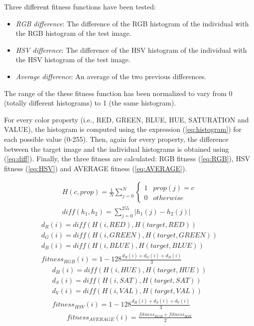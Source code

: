 \documentclass[a4paper,twoside]{article}
\begin{document}
Three different fitness functions have been tested:
\begin{itemize}
\item {\em RGB difference}: The difference of the RGB histogram of the individual with the RGB histogram of the test image.
\item {\em HSV difference}: The difference of the HSV histogram of the individual with the HSV histogram of the test image.
\item {\em Average difference}: An average of the two previous differences.
\end{itemize}

The range of the these fitness function has been normalized to vary from 0 (totally different histograms) to 1 (the same histogram).

For every color property (i.e., RED, GREEN, BLUE, HUE, SATURATION and VALUE), the histogram is computed using the expression (\ref{eq:histogram}) for each possible value (0-255). Then, again for every property, the difference between the target image and the individual histograms is obtained using (\ref{eq:diff}). Finally, the three fitness are calculated: RGB fitness (\ref{eq:RGB}), HSV fitness (\ref{eq:HSV}) and AVERAGE fitness (\ref{eq:AVERAGE}).

\begin{eqnarray}
	\label{eq:histogram}
	H(c, prop) = \frac{1}{N}\sum_{j=0}^N \left\{\begin{matrix}
1 & prop(j) = c\\ 
0 & otherwise
\end{matrix}\right. \\
\label{eq:diff}
diff(h_1, h_2) = \sum_{j=0}^{255} |h_1(j) - h_2(j)|
\end{eqnarray}
\begin{eqnarray}
	d_R(i) = diff(H(i, RED), H(target, RED))\\
	d_G(i) = diff(H(i, GREEN), H(target, GREEN))\\
	d_B(i) =  diff(H(i, BLUE), H(target, BLUE))\\
	\label{eq:RGB}
	fitness_{RGB}(i) = 1 - 128\frac{d_R(i) + d_G(i) + d_B(i)}{3}
\end{eqnarray}
\begin{eqnarray}
	d_H(i) = diff(H(i, HUE), H(target, HUE))\\
	d_S(i) = diff(H(i, SAT), H(target, SAT))\\
	d_V(i) =  diff(H(i, VAL), H(target, VAL))\\
	\label{eq:HSV}
	fitness_{HSV}(i) = 1 - 128\frac{d_H(i) + d_S(i) + d_V(i)}{3}
\end{eqnarray}
\begin{eqnarray}
	\label{eq:AVERAGE}
	fitness_{AVERAGE}(i) = \frac{fitness_{RGB}+fitness_{HSV}}{2}
\end{eqnarray}
\end{document}
